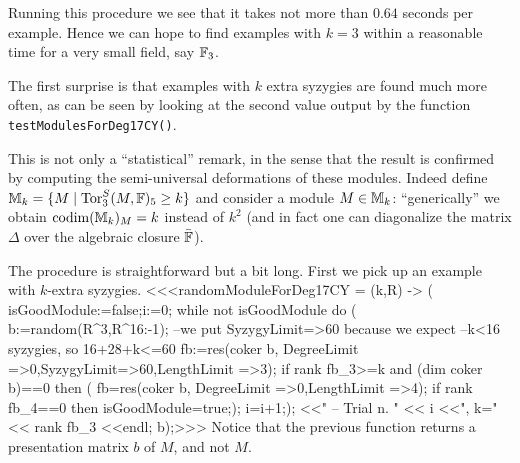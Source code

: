 Running this procedure we see that it takes not more than 
$0.64$ seconds per example.
Hence we can hope to find examples with $k=3$ within a reasonable time 
for a very small field, say ${\mathbb F}_3$. 

\medskip
The first surprise is that examples with $k$ extra syzygies 
are found much more often, 
as can be seen by looking at the second value output by the function {\tt testModulesForDeg17CY()}.

This is not only a ``statistical'' remark, in the sense that 
the result is confirmed by computing the semi-universal deformations of these modules.
Indeed define ${\mathbb M}_k=\{ M \mid {\rm{Tor}}^S_3(M,{\mathbb F})_5 \ge k \}$ and 
consider a module $M\in {\mathbb M}_k$:
``generically'' we obtain $\operatorname{codim}({\mathbb M}_k)_M=k$ instead of $k^2$
(and in fact one can diagonalize the matrix $\Delta$ over 
the algebraic closure $\bar{{\mathbb F}}$).

The procedure is straightforward but a bit long. 
First we pick up an example with $k$-extra syzygies.
<<<randomModuleForDeg17CY = (k,R) -> (
     isGoodModule:=false;i:=0;
     while not isGoodModule do (
          b:=random(R^3,R^{16:-1});
          --we put SyzygyLimit=>60 because we expect 
          --k<16 syzygies, so 16+28+k<=60
          fb:=res(coker b, 
               DegreeLimit =>0,SyzygyLimit=>60,LengthLimit =>3);
          if rank fb_3>=k and (dim coker b)==0 then (
               fb=res(coker b, DegreeLimit =>0,LengthLimit =>4);
               if rank fb_4==0 then isGoodModule=true;);
          i=i+1;);
     <<"     -- Trial n. " << i <<", k="<< rank fb_3 <<endl;
     b);>>>
Notice that the previous function returns a presentation matrix $b$ of $M$, 
and not $M$.

